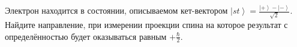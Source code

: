 \documentclass[__main__.tex]{subfiles}
\begin{document}
Электрон находится в состоянии, описываемом кет-вектором $\left|st\right>=\frac{\left|+\right>-\left|-\right>}{\sqrt{2}}$. Найдите направление, при измерении проекции спина на которое результат с определённостью будет оказываться равным $+\frac{\hbar}{2}$.\\ 

\end{document}
